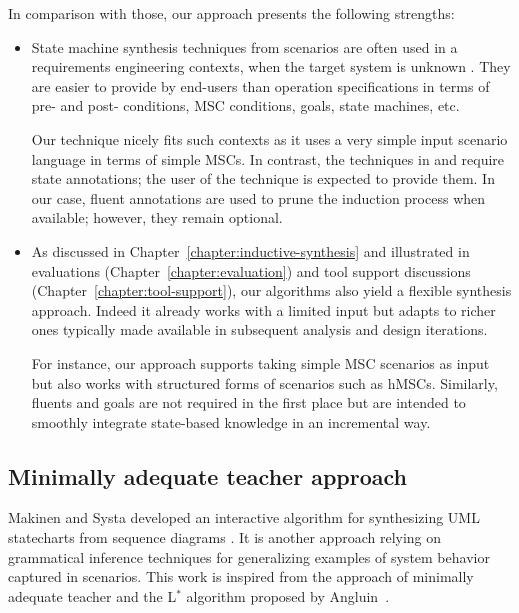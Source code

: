 In comparison with those, our approach presents the following strengths:
\begin{itemize}
\item State machine synthesis techniques from scenarios are often used in a requirements engineering contexts, when the target system is unknown \cite{Weidenhaupt:1998}. They are easier to provide by end-users than operation specifications in terms of pre- and post- conditions, MSC conditions, goals, state machines, etc. 

Our technique nicely fits such contexts as it uses a very simple input scenario language in terms of simple MSCs. In contrast, the techniques in \cite{Kruger:2000} and \cite{Whittle:2000} require state annotations; the user of the technique is expected to provide them. In our case, fluent annotations are used to prune the induction process when available; however, they remain optional.

\item As discussed in Chapter~\ref{chapter:inductive-synthesis} and illustrated in evaluations (Chapter~\ref{chapter:evaluation}) and tool support discussions (Chapter~\ref{chapter:tool-support}), our algorithms also yield a flexible synthesis approach. Indeed it already works with a limited input but adapts to richer ones typically made available in subsequent analysis and design iterations. 

For instance, our approach supports taking simple MSC scenarios as input but also works with structured forms of scenarios such as hMSCs. Similarly, fluents and goals are not required in the first place but are intended to smoothly integrate state-based knowledge in an incremental way.
\end{itemize}


\subsection{Minimally adequate teacher approach}

Makinen and Systa developed an interactive algorithm for synthesizing UML statecharts from sequence diagrams \cite{Makinen:2001}. It is another approach relying on grammatical inference techniques for generalizing examples of system behavior captured in scenarios. This work is inspired from the approach of minimally adequate teacher and the L$^*$ algorithm proposed by Angluin~\cite{Angluin:1987}. 

